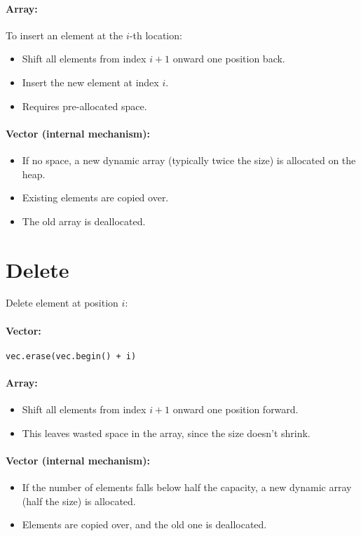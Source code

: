 \documentclass{article}
\begin{document}
\paragraph{Array:} 
To insert an element at the $i$-th location:
\begin{itemize}
    \item Shift all elements from index $i+1$ onward one position back.
    \item Insert the new element at index $i$.
    \item Requires pre-allocated space.
\end{itemize}

\paragraph{Vector (internal mechanism):}
\begin{itemize}
    \item If no space, a new dynamic array (typically twice the size) is allocated on the heap.
    \item Existing elements are copied over.
    \item The old array is deallocated.
\end{itemize}

\section{Delete}
Delete element at position $i$:

\paragraph{Vector:}
\begin{verbatim}
vec.erase(vec.begin() + i)
\end{verbatim}

\paragraph{Array:} 
\begin{itemize}
    \item Shift all elements from index $i+1$ onward one position forward.
    \item This leaves wasted space in the array, since the size doesn't shrink.
\end{itemize}

\paragraph{Vector (internal mechanism):}
\begin{itemize}
    \item If the number of elements falls below half the capacity, a new dynamic array (half the size) is allocated.
    \item Elements are copied over, and the old one is deallocated.
\end{itemize}
\end{document}
